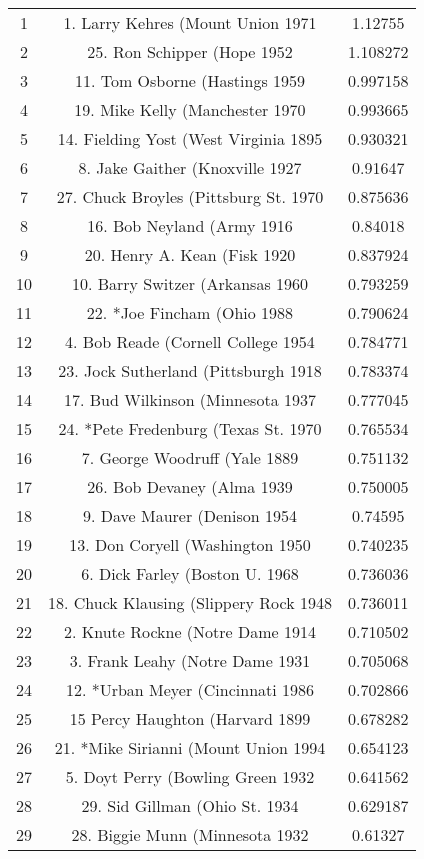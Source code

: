 \documentclass{mcmthesis}
\begin{document}
\begin{appendices}
\begin{longtable}{ccc}
 1     & 1. Larry Kehres (Mount Union 1971 & 1.12755 \\
    2     & 25. Ron Schipper (Hope 1952 & 1.108272 \\
    3     & 11. Tom Osborne (Hastings 1959 & 0.997158 \\
    4     & 19. Mike Kelly (Manchester 1970 & 0.993665 \\
    5     & 14. Fielding Yost (West Virginia 1895 & 0.930321 \\
    6     & 8. Jake Gaither (Knoxville 1927 & 0.91647 \\
    7     & 27. Chuck Broyles (Pittsburg St. 1970 & 0.875636 \\
    8     & 16. Bob Neyland (Army 1916 & 0.84018 \\
    9     & 20. Henry A. Kean (Fisk 1920 & 0.837924 \\
    10    & 10. Barry Switzer (Arkansas 1960 & 0.793259 \\
    11    & 22. *Joe Fincham (Ohio 1988 & 0.790624 \\
    12    & 4. Bob Reade (Cornell College 1954 & 0.784771 \\
    13    & 23. Jock Sutherland (Pittsburgh 1918 & 0.783374 \\
    14    & 17. Bud Wilkinson (Minnesota 1937 & 0.777045 \\
    15    & 24. *Pete Fredenburg (Texas St. 1970 & 0.765534 \\
    16    & 7. George Woodruff (Yale 1889 & 0.751132 \\
    17    & 26. Bob Devaney (Alma 1939 & 0.750005 \\
    18    & 9. Dave Maurer (Denison 1954 & 0.74595 \\
    19    & 13. Don Coryell (Washington 1950 & 0.740235 \\
    20    & 6. Dick Farley (Boston U. 1968 & 0.736036 \\
    21    & 18. Chuck Klausing (Slippery Rock 1948 & 0.736011 \\
    22    & 2. Knute Rockne (Notre Dame 1914 & 0.710502 \\
    23    & 3. Frank Leahy (Notre Dame 1931 & 0.705068 \\
    24    & 12. *Urban Meyer (Cincinnati 1986 & 0.702866 \\
    25    & 15  Percy Haughton (Harvard 1899 & 0.678282 \\
    26    & 21. *Mike Sirianni (Mount Union 1994 & 0.654123 \\
    27    & 5. Doyt Perry (Bowling Green 1932 & 0.641562 \\
    28    & 29. Sid Gillman (Ohio St. 1934 & 0.629187 \\
    29    & 28. Biggie Munn (Minnesota 1932 & 0.61327 \\
 \end{longtable}



\end{appendices}
\end{document}
